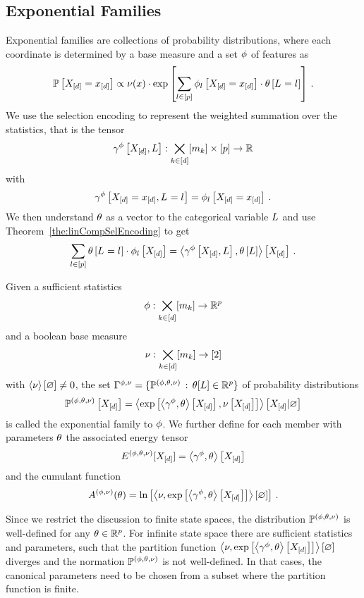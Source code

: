 \subsection{Exponential Families}\label{sec:exponentialFamilies}

Exponential families are collections of probability distributions, where each coordinate is determined by a base measure and a set $\phi$ of features as
	\[ \mathbb{P}\left[X_{[d]}=x_{[d]}\right]  \propto \nu(x) \cdot \mathrm{exp}\left[\sum_{l\in[p]} \phi_{l}\left[X_{[d]}=x_{[d]}\right] \cdot \theta\left[L_{}=l_{}\right]\right] \, . \]
We use the selection encoding to represent the weighted summation over the statistics, that is the tensor
	\[ \gamma^{\phi}\left[X_{[d]},L\right]: \bigtimes_{k\in[d]}[m_{k}] \times [p] \rightarrow \mathbb{R} \]
with
	\[ \gamma^{\phi}\left[X_{[d]}=x_{[d]},L_{}=l_{}\right] = \phi_{l}\left[X_{[d]}=x_{[d]}\right] \, . \]
We then understand $\theta$ as a vector to the categorical variable $L$ and use Theorem~\ref{the:linCompSelEncoding} to get
	\[ \sum_{l\in[p]}\theta\left[L_{}=l_{}\right]\cdot \phi_{l}\left[X_{[d]}\right]
		 = \left\langle \gamma^{\phi}\left[X_{[d]},L\right],\theta\left[L\right]\right\rangle \left[ X_{[d]} \right] \, . \]

\begin{definition}
	Given a sufficient statistics 
		\[ \phi : \bigtimes_{k\in[d]}[m_{k}] \rightarrow \mathbb{R}^p\]
	and a boolean base measure
		\[ \nu : \bigtimes_{k\in[d]}[m_{k}] \rightarrow [2] \]
	with $\left\langle \nu\right\rangle \left[ \varnothing \right]\neq0$,  the set $\Gamma^{\phi,\nu}=\{\mathbb{P}^{(\phi,\theta,\nu)} \, : \, \theta[L] \in \mathbb{R}^{p}\}$ of probability distributions 
		\[ \mathbb{P}^{(\phi,\theta,\nu)}\left[X_{[d]}\right] = \left\langle \mathrm{exp}\left[\left\langle \gamma^{\phi},\theta\right\rangle \left[ X_{[d]} \right],\nu\left[X_{[d]}\right]\right]\right\rangle \left[ X_{[d]} | \varnothing \right] \]
	is called the exponential family to $\phi$.
	We further define for each member with parameters $\theta$ the associated energy tensor
		\[ E^{(\phi,\theta,\nu)}[X_{[d]}] = \left\langle \gamma^{\phi},\theta\right\rangle \left[ X_{[d]} \right] \]
	and the cumulant function
		\[ A^{(\phi,\nu)}(\theta) = \ln \left[ \left\langle \nu,\mathrm{exp}\left[\left\langle \gamma^{\phi},\theta\right\rangle \left[ X_{[d]} \right] \right]\right\rangle \left[ \varnothing \right]  \right] \, .\]
\end{definition}



Since we restrict the discussion to finite state spaces, the distribution $\mathbb{P}^{(\phi,\theta,\nu)}$ is well-defined for any $\theta\in\mathbb{R}^{p}$.
For infinite state space there are sufficient statistics and parameters, such that the partition function $\left\langle \nu,\mathrm{exp}\left[\left\langle \gamma^{\phi},\theta\right\rangle \left[ X_{[d]} \right]\right]\right\rangle \left[ \varnothing \right]$ diverges and the normation $\mathbb{P}^{(\phi,\theta,\nu)}$ is not well-defined.
In that cases, the canonical parameters need to be chosen from a subset where the partition function is finite. 

